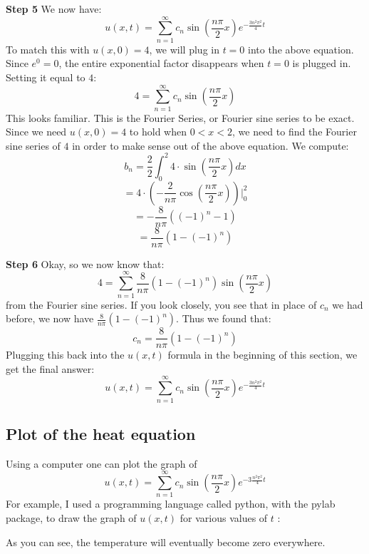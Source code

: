 \documentclass[12pt]{report}
\begin{document}
\textbf{Step 5} We now have:
$$u(x,t) = \sum_{n=1}^{\infty} c_n \sin \left(\frac{n\pi}{2} x \right) e^{-\frac{3n^2 \pi^2}{4} t}$$
To match this with $u(x,0)=4$, we will plug in $t=0$ into the above equation. Since $e^0 =0$, the entire exponential factor disappears when $t=0$ is plugged in. Setting it equal to $4$:
$$4 = \sum_{n=1}^{\infty} c_n \sin \left(\frac{n\pi}{2} x \right) $$
This looks familiar. This is the Fourier Series, or Fourier sine series to be exact. Since we need $u(x,0)=4$ to hold when $0<x<2$, we need to find the Fourier sine series of $4$ in order to make sense out of the above equation. We compute:
$$b_n = \frac{2}{2} \int_{0}^{2} 4\cdot \sin \left(\frac{n\pi}{2} x \right)dx$$
$$= 4\cdot \left(-\frac{2}{n\pi} \cos \left(\frac{n\pi}{2} x \right) \right) \Bigg\vert_0^2$$
$$= -\frac{8}{n\pi} \left( (-1)^n -1 \right)$$
$$= \frac{8}{n\pi} \left( 1-(-1)^n  \right)$$

\textbf{Step 6} Okay, so we now know that:
$$4 = \sum_{n=1}^{\infty} \frac{8}{n\pi} \left( 1-(-1)^n  \right)\sin \left(\frac{n\pi}{2} x \right) $$
from the Fourier sine series. If you look closely, you see that in place of $c_n$ we had before, we now have $\frac{8}{n\pi} \left( 1-(-1)^n  \right)$. Thus we found that:
$$c_n=\frac{8}{n\pi} \left( 1-(-1)^n  \right)$$
Plugging this back into the $u(x,t)$ formula in the beginning of this section, we get the final answer:
$$u(x,t) = \sum_{n=1}^{\infty} c_n \sin \left(\frac{n\pi}{2} x \right) e^{-\frac{3n^2 \pi^2}{4} t}$$

\subsection*{Plot of the heat equation}
Using a computer one can plot the graph of
$$u(x,t) = \sum_{n=1}^{\infty} c_n \sin \left(\frac{n\pi}{2} x \right) e^{-3\frac{n^2 \pi^2}{4} t}$$
For example, I used a programming language called python, with the pylab package, to draw the graph of $u(x,t)$ for various values of $t$ :
\begin{center}  \end{center}
As you can see, the temperature will eventually become zero everywhere.
\end{document}
